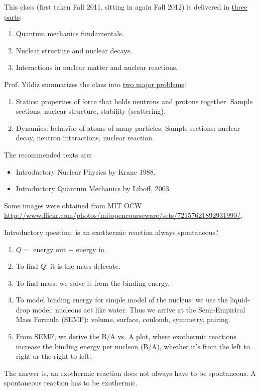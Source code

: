 \documentclass{school-22.101-notes}
\date{September 7, 2011}
\begin{document}
\maketitle


This class (first taken Fall 2011, sitting in again Fall 2012) is delivered in \uline{three parts}:
\begin{enumerate}
\item Quantum mechanics fundamentals. 
\item Nuclear structure and nuclear decays.
\item Interactions in nuclear matter and nuclear reactions.
\end{enumerate}

Prof. Yildiz summarizes the class into \uline{two major problems}:
\begin{enumerate}
\item Statics: properties of force that holds neutrons and protons together. Sample sections: nuclear structure, stability (scattering). 

\item Dynamics: behavior of atoms of many particles. Sample sections: nuclear decay, neutron interactions, nuclear reaction. 
\end{enumerate}



The recommended texts are: 
\begin{itemize}
\item Introductory Nuclear Physics by Krane 1988.
\item Introductory Quantum Mechanics by Liboff, 2003.
\end{itemize}
Some images were obtained from MIT OCW \url{http://www.flickr.com/photos/mitopencourseware/sets/72157621892931990/}. 

\vspace{0.5cm}
Introductory question: is an exothermic reaction always spontaneous? 
\begin{enumerate}
\item $Q = $ energy out $-$ energy in. 
\item To find $Q$: it is the mass defecate. 
\item To find mass: we solve it from the binding energy. 
\item To model binding energy for simple model of the nucleus: we use the liquid-drop model: nucleons act like water. Thus we arrive at the Semi-Empirical Mass Formula (SEMF): volume, surface, coulomb, symmetry, pairing.  
\item From SEMF, we derive the B/A vs. A plot, where exothermic reactions increase the binding energy per nucleon (B/A), whether it's from the left to right or the right to left.
\end{enumerate}
The answer is, an exothermic reaction does not always have to be spontaneous. A spontaneous reaction has to be exothermic. 
\end{document}
